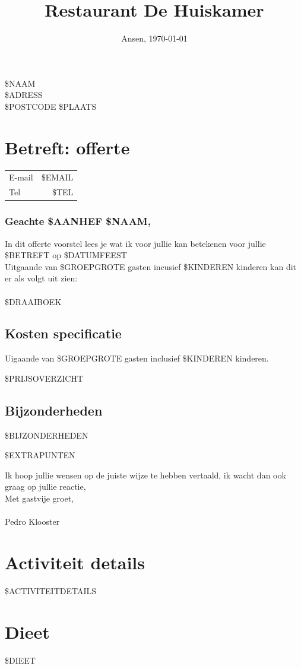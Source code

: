 \documentclass{scrartcl}
\begin{document}

\title{Restaurant De Huiskamer}
\date{Ansen, \today}
\maketitle
\thispagestyle{empty}

\begin{flushright}
	\$NAAM \\
	\$ADRESS \\
	\$POSTCODE \$PLAATS
\end{flushright}
\section{Betreft: offerte}
\begin{tabular}{l r}
  E-mail & \$EMAIL  \\
  Tel & \$TEL  \\
\end{tabular}

\subsubsection*{Geachte \$AANHEF \$NAAM,}

In dit offerte voorstel lees je wat ik voor jullie kan betekenen voor jullie  \$BETREFT op \$DATUMFEEST \\

Uitgaande van \$GROEPGROTE gasten incusief \$KINDEREN kinderen kan dit er als volgt uit zien: \\\\
\$DRAAIBOEK

\newpage

\subsection*{Kosten specificatie}
Uigaande van \$GROEPGROTE gasten inclusief \$KINDEREN kinderen.

\$PRIJSOVERZICHT

\subsection*{Bijzonderheden}

\$BIJZONDERHEDEN

\$EXTRAPUNTEN

Ik hoop jullie  wensen op de juiste wijze te hebben vertaald, ik wacht dan ook graag op jullie  reactie, \\

Met gastvije groet, \\\\

Pedro Klooster

\newpage

\section{Activiteit details}

\$ACTIVITEITDETAILS

\section{Dieet}

\$DIEET
\end{document}
